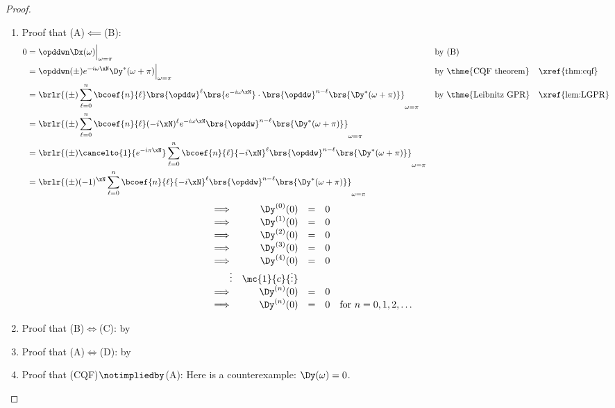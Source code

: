 \begin{proof}
\begin{enumerate}
  \item Proof that (A)$\impliedby$(B):
    \begin{align*}
      0
        &= \opddwn\Dx(\omega)\Big|_{\omega=\pi}
        && \text{by (B)}
      \\&= \opddwn(\pm) e^{-i\omega\xN} \Dy^\ast(\omega+\pi)\Big|_{\omega=\pi}
        && \text{by \thme{CQF theorem}}
        && \text{\xref{thm:cqf}}
      \\&= \brlr{(\pm) \sum_{\ell=0}^n \bcoef{n}{\ell} \brs{\opddw}^\ell\brs{e^{-i\omega\xN}}\cdot\brs{\opddw}^{n-\ell}\brs{\Dy^\ast(\omega+\pi)}}_{\omega=\pi}
        && \text{by \thme{Leibnitz GPR}}
        && \text{\xref{lem:LGPR}}
      \\&= \brlr{(\pm) \sum_{\ell=0}^n \bcoef{n}{\ell} (-i\xN)^\ell e^{-i\omega\xN}\brs{\opddw}^{n-\ell}\brs{\Dy^\ast(\omega+\pi)}}_{\omega=\pi}
      \\&= \brlr{(\pm) \cancelto{1}{e^{-i\pi\xN}} \sum_{\ell=0}^n \bcoef{n}{\ell} {-i\xN}^\ell \brs{\opddw}^{n-\ell}\brs{\Dy^\ast(\omega+\pi)}}_{\omega=\pi}
      \\&= \brlr{(\pm) (-1)^\xN \sum_{\ell=0}^n \bcoef{n}{\ell} {-i\xN}^\ell \brs{\opddw}^{n-\ell}\brs{\Dy^\ast(\omega+\pi)}}_{\omega=\pi}
    \end{align*}
  \[\begin{array}{r rcl l}
    \implies & \Dy^{(0)}(0) &=& 0 \\
    \implies & \Dy^{(1)}(0) &=& 0 \\
    \implies & \Dy^{(2)}(0) &=& 0 \\
    \implies & \Dy^{(3)}(0) &=& 0 \\
    \implies & \Dy^{(4)}(0) &=& 0 \\
    \vdots   & \mc{1}{c}{\vdots}    \\
    \implies & \Dy^{(n)}(0) &=& 0 \\
    \implies & \Dy^{(n)}(0) &=& 0 & \text{for $n=0,1,2,\ldots$}
  \end{array}\]

  \item Proof that (B)$\iff$(C): by 
  \item Proof that (A)$\iff$(D): by 
  \item Proof that (CQF)$\notimpliedby$(A): Here is a counterexample: $\Dy(\omega)=0$.

\end{enumerate}
\end{proof}

